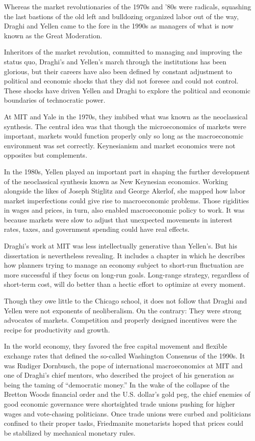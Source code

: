 \documentclass[
]{book}
\begin{document}
Whereas the market revolutionaries of the 1970s and '80s were radicals, squashing the last bastions of the old left and bulldozing organized labor out of the way, Draghi and Yellen came to the fore in the 1990s as managers of what is now known as the Great Moderation.

Inheritors of the market revolution, committed to managing and improving the status quo, Draghi's and Yellen's march through the institutions has been glorious, but their careers have also been defined by constant adjustment to political and economic shocks that they did not foresee and could not control. These shocks have driven Yellen and Draghi to explore the political and economic boundaries of technocratic power.

At MIT and Yale in the 1970s, they imbibed what was known as the neoclassical synthesis. The central idea was that though the microeconomics of markets were important, markets would function properly only so long as the macroeconomic environment was set correctly. Keynesianism and market economics were not opposites but complements.

In the 1980s, Yellen played an important part in shaping the further development of the neoclassical synthesis known as New Keynesian economics. Working alongside the likes of Joseph Stiglitz and George Akerlof, she mapped how labor market imperfections could give rise to macroeconomic problems.
Those rigidities in wages and prices, in turn, also enabled macroeconomic policy to work. It was because markets were slow to adjust that unexpected movements in interest rates, taxes, and government spending could have real effects.

Draghi's work at MIT was less intellectually generative than Yellen's. But his dissertation is nevertheless revealing. It includes a chapter in which he describes how planners trying to manage an economy subject to short-run fluctuation are more successful if they focus on long-run goals. Long-range strategy, regardless of short-term cost, will do better than a hectic effort to optimize at every moment.

Though they owe little to the Chicago school, it does not follow that Draghi and Yellen were not exponents of neoliberalism. On the contrary: They were strong advocates of markets.
Competition and properly designed incentives were the recipe for productivity and growth.

In the world economy, they favored the free capital movement and flexible exchange rates that defined the so-called Washington Consensus of the 1990s. It was Rudiger Dornbusch, the pope of international macroeconomics at MIT and one of Draghi's chief mentors, who described the project of his generation as being the taming of ``democratic money.'' In the wake of the collapse of the Bretton Woods financial order and the U.S. dollar's gold peg, the chief enemies of good economic governance were shortsighted trade unions pushing for higher wages and vote-chasing politicians. Once trade unions were curbed and politicians confined to their proper tasks, Friedmanite monetarists hoped that prices could be stabilized by mechanical monetary rules.
\end{document}
